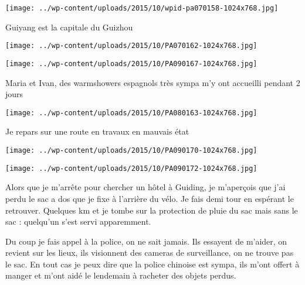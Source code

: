  

\begin{center} \texttt{[image: ../wp-content/uploads/2015/10/wpid-pa070158-1024x768.jpg]} \end{center}

 

 Guiyang est la capitale du Guizhou 

 

\begin{center} \texttt{[image: ../wp-content/uploads/2015/10/PA070162-1024x768.jpg]} \end{center}

 

 

\begin{center} \texttt{[image: ../wp-content/uploads/2015/10/PA090167-1024x768.jpg]} \end{center}

 

 Maria et Ivan, des warmshowers espagnols très sympa m'y ont accueilli pendant 2 jours 

 

\begin{center} \texttt{[image: ../wp-content/uploads/2015/10/PA080163-1024x768.jpg]} \end{center}

 

 Je repars sur une route en travaux en mauvais état 

 

\begin{center} \texttt{[image: ../wp-content/uploads/2015/10/PA090170-1024x768.jpg]} \end{center}

 

 

\begin{center} \texttt{[image: ../wp-content/uploads/2015/10/PA090172-1024x768.jpg]} \end{center}

 

 Alors que je m'arrête pour chercher un hôtel à Guiding, je m'aperçois que j'ai perdu le sac a dos que je fixe à l'arrière du vélo. Je fais demi tour en espérant le retrouver. Quelques km et je tombe sur la protection de pluie du sac mais sans le sac : quelqu'un s'est servi apparemment. 

 Du coup je fais appel à la police, on ne sait jamais. Ils essayent de m'aider, on revient sur les lieux, ils visionnent des cameras de surveillance, on ne trouve pas le sac. En tout cas je peux dire que la police chinoise est sympa, ils m'ont offert à manger et m'ont aidé le lendemain à racheter des objets perdus. 

